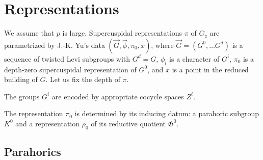 \documentclass[12pt]{amsart}
\newcommand{\fG}{\mathfrak G}
\theoremstyle{plain}
\theoremstyle{definition}
\begin{document}
\section{Representations}
We assume that $p$ is large. 
Supercuspidal representations $\pi$ of $G_z$ are parametrized by J.-K. Yu's data 
$(\vec G, \vec\phi, \pi_0, x)$, where $\vec G=(G^0, \dots G^d)$ is a sequence of twisted Levi subgroups with $G^d=G$, $\phi_i$ is a character of $G^i$, $\pi_0$ is a depth-zero supercuspidal representation of $G^0$, and $x$ is a point in the reduced building of $G$.
Let us fix the depth of $\pi$. 

The groups $G^i$ are encoded by appropriate  cocycle spaces $Z^i$.

The representation $\pi_0$ is determined by its inducing datum: a parahoric subgroup $K^0$ and a representation $\rho_0$ of its reductive quotient $\fG^0$. 

\subsection{Parahorics}

\renewcommand\AA{\mathcal A}
\newcommand\affW{W_{\text{aff}}}
\newcommand\BB{\mathcal B}
	\newcommand\motB{\BB_{\text{mot}}}
	\newcommand\motBwith[1]{\BB_{\text{mot; #1}}}
\newcommand\bS{\mathbf S}
\newcommand\Cent{C}
	\newcommand\ldef{\mathrel{:=}}
\newcommand\dota{\cdot}
\newcommand\field{F}
	\newcommand\unfield{F^{\text{un}}}
\newcommand\Int{\operatorname{Int}}
\newcommand\Lxxx[1]{\ensuremath\spadesuit\footnote{\ensuremath\spadesuit\ #1}}
	\newcommand\citeme{\Lxxx{Cite me!}}
	\newcommand\refme{\Lxxx{Reference me!}}
\newcommand\muhat{\widehat\mu}
\newcommand\Nchar{\Phi}
\newcommand\NFTorbit{\widehat O}
\newcommand\Norm{N}
\DeclarePairedDelimiterX\pair[2]\langle{}
\newcommand\Root{\Phi}
	\newcommand\AffRoot{\Psi}
\newcommand\Simple{\Delta}
\newcommand\st{\mathbin:}
\newcommand\stab{\operatorname{stab}}
	\newcommand\lsub{\prescript{}}
	\newcommand\lsup[1]{\prescript{#1}{}}

\makeatletter
\newcommand\topcite[1]{\gdef\t@pic{#1}\cite{#1}}
\newcommand\loccit{\expandafter\cite\expandafter{\t@pic}}
\makeatother
\end{document}
